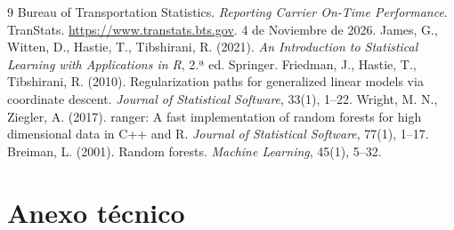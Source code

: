 \documentclass[11pt,a4paper]{article}
\begin{document}
\begin{thebibliography}{9}
 Bureau of Transportation Statistics. \emph{Reporting Carrier On-Time Performance}. TranStats. \url{https://www.transtats.bts.gov}. 4 de Noviembre de 2026.
 James, G., Witten, D., Hastie, T., Tibshirani, R. (2021). \emph{An Introduction to Statistical Learning with Applications in R}, 2.ª ed. Springer.
 Friedman, J., Hastie, T., Tibshirani, R. (2010). Regularization paths for generalized linear models via coordinate descent. \emph{Journal of Statistical Software}, 33(1), 1--22.
 Wright, M. N., Ziegler, A. (2017). ranger: A fast implementation of random forests for high dimensional data in C++ and R. \emph{Journal of Statistical Software}, 77(1), 1--17.
 Breiman, L. (2001). Random forests. \emph{Machine Learning}, 45(1), 5--32.
\end{thebibliography}
 
\appendix
\section{Anexo técnico}\label{anexo}
 
\end{document}
